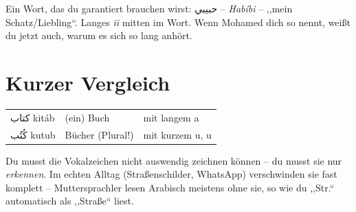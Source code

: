 \begin{tippbox}
Ein Wort, das du garantiert brauchen wirst: \textarabic{\Large حبيبي} --
\textit{Hab\'ibi} -- ,,mein Schatz/Liebling``. Langes \textit{ii} mitten
im Wort. Wenn Mohamed dich so nennt, weißt du jetzt auch, warum es sich
so lang anhört.
\end{tippbox}

\section*{Kurzer Vergleich}

\begin{center}
\begin{tabular}{lll}
\textarabic{\Large كتاب} kit\'ab & (ein) Buch & mit langem a \\
\textarabic{\Large كُتُب} kutub & Bücher (Plural!) & mit kurzem u, u \\
\end{tabular}
\end{center}

\begin{checkpointbox}
Du musst die Vokalzeichen nicht auswendig zeichnen können -- du musst sie
nur \emph{erkennen}. Im echten Alltag (Straßenschilder, WhatsApp)
verschwinden sie fast komplett -- Muttersprachler lesen Arabisch meistens
ohne sie, so wie du ,,Str.`` automatisch als ,,Straße`` liest.
\end{checkpointbox}
